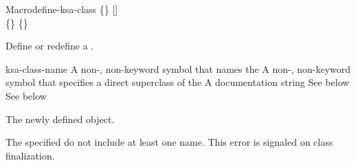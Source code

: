 \documentclass[10pt,twoside,english,pdftex]{article}
\begin{document}
\begin{functiondoc}{Macro}{define-ksa-class}%
   { 
   \code{(}\{\}\superstar\code{)}
   [] \\
   \code{(}\{\}\superstar\code{)}
   \{\}\superstar{} \returns{}
   }
%
%
%

\fnsyntax

\fnpurpose Define or redefine a .

\fnpackage {}

\fnmodule {}

\fnargs
\begin{args}{ksa-class-name}
 A non-\nil, non-keyword symbol that names the
 A non-\nil, non-keyword symbol that specifies a
direct superclass of the    
\arg[documentation] A documentation string
 See below
 See below
\end{args}

\fnreturns The newly defined  object.

\fnerrors The specified  do not include at least
one  name.  This error is signaled on class finalization.


\end{functiondoc}
\end{document}
